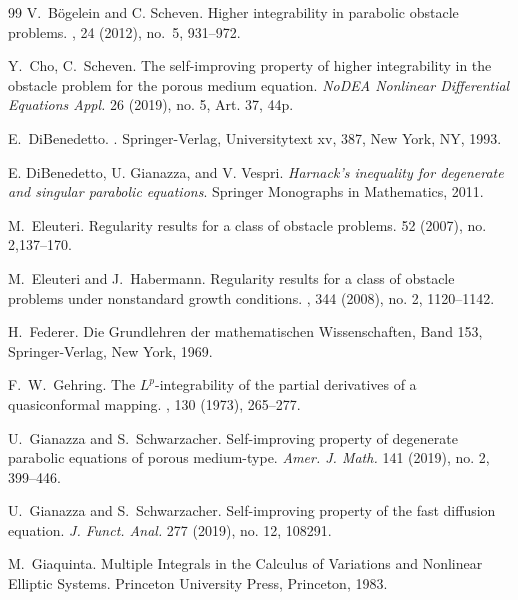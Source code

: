 \documentclass[a4paper, 10pt, american]{amsart}
\numberwithin{theorem}{section}
\numberwithin{equation}{section}
\begin{document}
\begin{thebibliography}{99}
\newblock V.~B\"ogelein and C. Scheven.
\newblock Higher integrability in parabolic obstacle problems.
, 24 (2012), no.~5, 931--972.


  \newblock Y.~Cho, C.~Scheven.
  \newblock The self-improving property of higher integrability in the
  obstacle problem for the porous medium equation.
  \newblock \emph{NoDEA Nonlinear Differential Equations Appl.} 26
  (2019), no. 5, Art. 37, 44p. 

E.~DiBenedetto.
.
\newblock Springer-Verlag, Universitytext xv, 387, New York, NY, 1993.

E. DiBenedetto, U. Gianazza, and V. Vespri. 
{\it Harnack's inequality for degenerate and singular parabolic equations}.
Springer Monographs in Mathematics, 2011.

M.~Eleuteri.
\newblock Regularity results for a class of obstacle problems.
 52 (2007), no. 2,137--170.

M.~Eleuteri and J.~Habermann.
\newblock Regularity results for a class of obstacle problems under nonstandard growth conditions.
, 344 (2008), no. 2, 1120--1142.


\newblock H.~Federer.
\newblock Die Grundlehren der mathematischen Wissenschaften, Band 153, Springer-Verlag, New York, 1969.

\newblock F.~W.~Gehring.
\newblock The $L^p$-integrability of the partial derivatives of a quasiconformal mapping.
, 130 (1973), 265--277.

\newblock U.~Gianazza and S.~Schwarzacher.
\newblock Self-improving property of degenerate parabolic equations of porous medium-type.
\newblock \emph{Amer. J. Math.} 141 (2019), no. 2, 399--446.


\newblock U.~Gianazza and S.~Schwarzacher.
\newblock Self-improving property of the fast diffusion equation.
\newblock \emph{J. Funct. Anal.} 277 (2019), no. 12, 108291.


\newblock M.~Giaquinta.
\newblock Multiple Integrals in the Calculus of Variations and Nonlinear Elliptic Systems.
\newblock Princeton University Press, Princeton, 1983.


\end{thebibliography}
\end{document}
